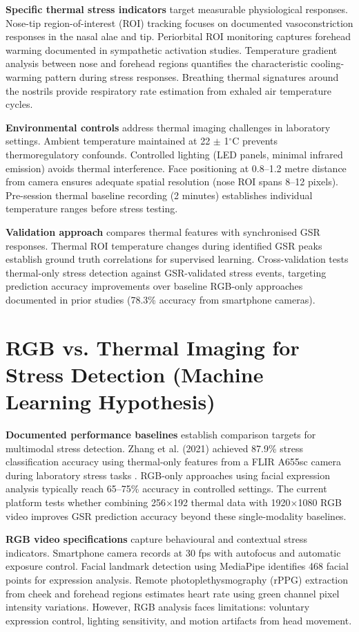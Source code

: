 \textbf{Specific thermal stress indicators} target measurable physiological responses. Nose-tip region-of-interest (ROI) tracking focuses on documented vasoconstriction responses in the nasal alae and tip. Periorbital ROI monitoring captures forehead warming documented in sympathetic activation studies. Temperature gradient analysis between nose and forehead regions quantifies the characteristic cooling-warming pattern during stress responses. Breathing thermal signatures around the nostrils provide respiratory rate estimation from exhaled air temperature cycles.

\textbf{Environmental controls} address thermal imaging challenges in laboratory settings. Ambient temperature maintained at 22 $\pm$ 1$^\circ$C prevents thermoregulatory confounds. Controlled lighting (LED panels, minimal infrared emission) avoids thermal interference. Face positioning at 0.8--1.2 metre distance from camera ensures adequate spatial resolution (nose ROI spans 8--12 pixels). Pre-session thermal baseline recording (2 minutes) establishes individual temperature ranges before stress testing.

\textbf{Validation approach} compares thermal features with synchronised GSR responses. Thermal ROI temperature changes during identified GSR peaks establish ground truth correlations for supervised learning. Cross-validation tests thermal-only stress detection against GSR-validated stress events, targeting prediction accuracy improvements over baseline RGB-only approaches documented in prior studies (78.3\% accuracy from smartphone cameras).

\section{RGB vs. Thermal Imaging for Stress Detection (Machine Learning Hypothesis)}
\textbf{Documented performance baselines} establish comparison targets for multimodal stress detection. Zhang et al. (2021) achieved 87.9\% stress classification accuracy using thermal-only features from a FLIR A655sc camera during laboratory stress tasks \cite{ref5}. RGB-only approaches using facial expression analysis typically reach 65--75\% accuracy in controlled settings. The current platform tests whether combining 256$\times$192 thermal data with 1920$\times$1080 RGB video improves GSR prediction accuracy beyond these single-modality baselines.

\textbf{RGB video specifications} capture behavioural and contextual stress indicators. Smartphone camera records at 30 fps with autofocus and automatic exposure control. Facial landmark detection using MediaPipe identifies 468 facial points for expression analysis. Remote photoplethysmography (rPPG) extraction from cheek and forehead regions estimates heart rate using green channel pixel intensity variations. However, RGB analysis faces limitations: voluntary expression control, lighting sensitivity, and motion artifacts from head movement.


